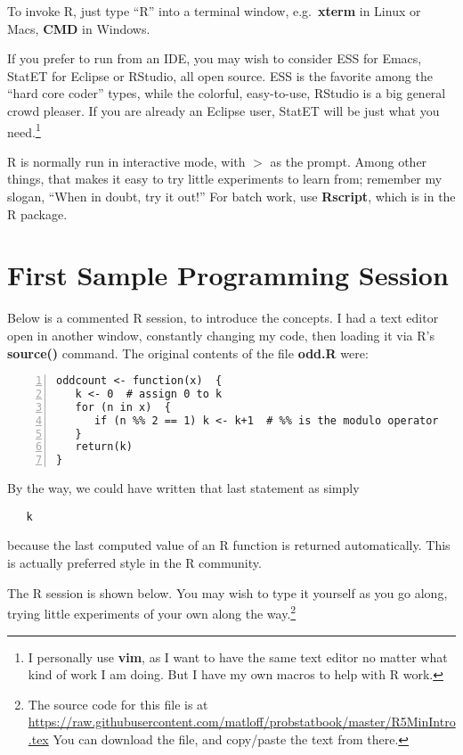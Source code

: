 To invoke R, just type ``R'' into a terminal window, e.g.\ {\bf xterm}
in Linux or Macs, {\bf CMD} in Windows.

If you prefer to run from an IDE, you may wish to consider ESS for
Emacs, StatET for Eclipse or RStudio, all open source.  ESS is the
favorite among the ``hard core coder'' types, while the colorful,
easy-to-use, RStudio is a big general crowd pleaser.  If you are already
an Eclipse user, StatET will be just what you need.\footnote{I personally use
{\bf vim}, as I want to have the same text editor no matter what kind of
work I am doing.  But I have my own macros to help with R work.}

R is normally run in interactive mode, with $>$ as the prompt.  Among 
other things, that makes it easy to try little experiments to learn
from; remember my slogan, ``When in doubt, try it out!''  For batch
work, use {\bf Rscript}, which is in the R package.

\section{First Sample Programming Session}

Below is a commented R session, to introduce the concepts. I had a text
editor open in another window, constantly changing my code, then loading
it via R's {\bf source()} command.  The original contents of the file
{\bf odd.R} were:

\begin{lstlisting}[numbers=left]
oddcount <- function(x)  {
   k <- 0  # assign 0 to k
   for (n in x)  {
      if (n %% 2 == 1) k <- k+1  # %% is the modulo operator
   }
   return(k)
}
\end{lstlisting}

By the way, we could have written that last statement as simply 

\begin{lstlisting}
   k
\end{lstlisting}

because the last computed value of an R function is returned
automatically.  This is actually preferred style in the R community.

The R session is shown below.  You may wish to type it yourself as you
go along, trying little experiments of your own along the
way.\footnote{The source code for this file is at
\url{https://raw.githubusercontent.com/matloff/probstatbook/master/R5MinIntro.tex}
You can download the file, and copy/paste the text from there.}

